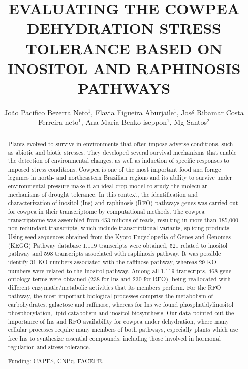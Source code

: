 \documentclass[twoside]{article}
\title{\vspace{-15mm}\fontsize{24pt}{10pt}\selectfont\textbf{EVALUATING THE COWPEA DEHYDRATION STRESS TOLERANCE BASED ON INOSITOL AND RAPHINOSIS PATHWAYS}} %
\author{Jo\~ao Pacifico Bezerra Neto$^1$, Flavia Figueira Aburjaile$^1$, Jos\'e Ribamar Costa Ferreira-neto$^1$, Ana Maria Benko-iseppon$^1$, Mg Santos$^2$}
\affil{1 UFPE, CENTER OF BIOLOGICAL SCIENCES, GENETICS DEPT\\ 2 UFPE, BOTANY DEPT, PLANT PHYSIOLOGY LABORATORY\\ }
\date{}
\begin{document}
\maketitle %

\thispagestyle{fancy} %


\begin{abstract}
Plants evolved to survive in environments that often impose adverse conditions, such as abiotic and biotic stresses. They developed several survival mechanisms that enable the detection of environmental changes, as well as induction of specific responses to imposed stress conditions. Cowpea is one of the most important food and forage legumes in north- and northeastern Brazilian regions and its ability to survive under environmental pressure make it an ideal crop model to study the molecular mechanisms of drought tolerance. In this context, the identification and characterization of inositol (Ins) and raphinosis (RFO) pathways genes was carried out for cowpea in their transcriptome by computational methods. The cowpea transcriptome was assembled from 453 milions of reads, resulting in more than 185,000 non-redundant transcripts, which include transcriptional variants, splicing products. Using seed sequences obtained from the Kyoto Encyclopedia of Genes and Genomes (KEGG) Pathway database 1.119 transcripts were obtained, 521 related to inositol pathway and 598 transcripts associated with raphinosis pathway. It was possible identify 31 KO numbers associated with the raffinose pathway, whereas 29 KO numbers were related to the Inositol pathway. Among all 1.119 transcripts, 468 gene ontology terms were obtained (238 for Ins and 230 for RFO), being reallocated with different enzymatic/metabolic activities that its members perform. For the RFO pathway, the most important biological processes comprise the metabolism of carbohydrates, galactose and raffinose, whereas for Ins we found phosphatidylinositol phosphorylation, lipid catabolism and inositol biosynthesis. Our data pointed out the importance of Ins and RFO availability for cowpea under dehydration, where many cellular processes require many members of both pathways, especially plants which use free Ins to synthesize essential compounds, including those involved in hormonal regulation and stress tolerance.

Funding: CAPES, CNPq, FACEPE.
\end{abstract}
\end{document}
